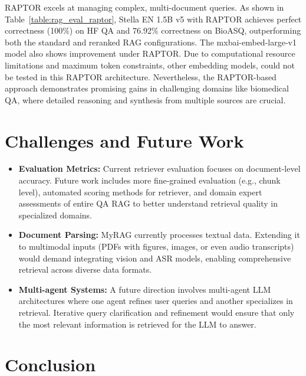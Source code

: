 \documentclass{scrartcl}
\begin{document}
RAPTOR excels at managing complex, multi-document queries. As shown in Table~\ref{table:rag_eval_raptor}, Stella EN 1.5B v5 with RAPTOR achieves perfect correctness (100\%) on HF QA and 76.92\% correctness on BioASQ, outperforming both the standard and reranked RAG configurations. The mxbai-embed-large-v1 model also shows improvement under RAPTOR. Due to computational resource limitations and maximum token constraints, other embedding models, could not be tested in this RAPTOR architecture. Nevertheless, the RAPTOR-based approach demonstrates promising gains in challenging domains like biomedical QA, where detailed reasoning and synthesis from multiple sources are crucial.

\section{Challenges and Future Work}
\begin{itemize}
    \item \textbf{Evaluation Metrics:} Current retriever evaluation focuses on document-level accuracy. Future work includes more fine-grained evaluation (e.g., chunk level), automated scoring methods for retriever, and domain expert assessments of entire QA RAG to better understand retrieval quality in specialized domains.
    
    \item \textbf{Document Parsing:} MyRAG currently processes textual data. Extending it to multimodal inputs (PDFs with figures, images, or even audio transcripts) would demand integrating vision and ASR models, enabling comprehensive retrieval across diverse data formats.
    
    \item \textbf{Multi-agent Systems:} A future direction involves multi-agent LLM architectures where one agent refines user queries and another specializes in retrieval. Iterative query clarification and refinement would ensure that only the most relevant information is retrieved for the LLM to answer.
\end{itemize}

\section{Conclusion}
\end{document}
